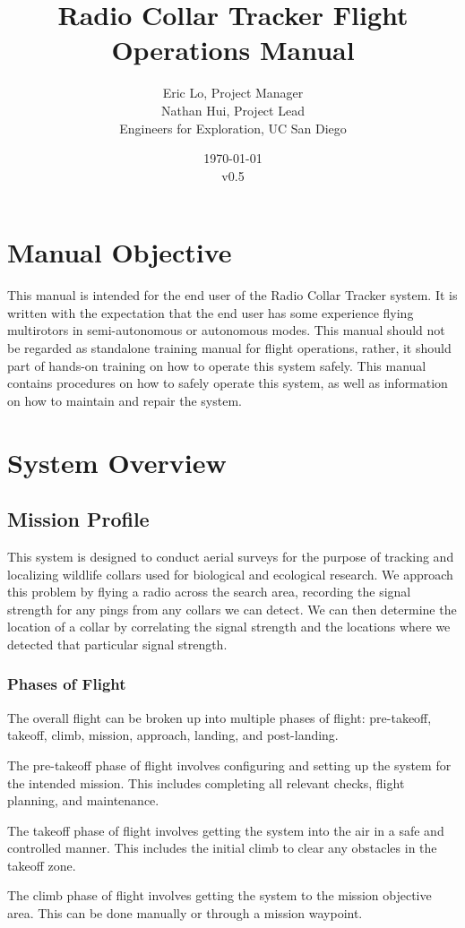 \documentclass{report}
\title{Radio Collar Tracker Flight Operations Manual}
\author{Eric Lo, Project Manager\\Nathan Hui, Project Lead\\Engineers for Exploration, UC San Diego}
\date{\today\\v0.5}
\begin{document}
\maketitle
\tableofcontents
\chapter{Manual Objective}
	This manual is intended for the end user of the Radio Collar Tracker system.  It is written with the expectation that the end user has some experience flying \glspl{multirotor} in semi-autonomous or autonomous modes.  This manual should not be regarded as standalone training manual for flight operations, rather, it should part of hands-on training on how to operate this system safely.  This manual contains procedures on how to safely operate this system, as well as information on how to maintain and repair the system.
\chapter{System Overview}
	\section{Mission Profile}
		This system is designed to conduct aerial surveys for the purpose of tracking and localizing wildlife collars used for biological and ecological research.  We approach this problem by flying a radio across the search area, recording the signal strength for any pings from any collars we can detect.  We can then determine the location of a collar by correlating the signal strength and the locations where we detected that particular signal strength.

		\subsection{Phases of Flight}
			The overall flight can be broken up into multiple phases of flight: pre-takeoff, takeoff, climb, mission, approach, landing, and post-landing.

			The pre-takeoff phase of flight involves configuring and setting up the system for the intended mission.  This includes completing all relevant checks, flight planning, and maintenance.

			The takeoff phase of flight involves getting the system into the air in a safe and controlled manner.  This includes the initial climb to clear any obstacles in the takeoff zone.

			The climb phase of flight involves getting the system to the mission objective area.  This can be done manually or through a mission waypoint.
\end{document}
